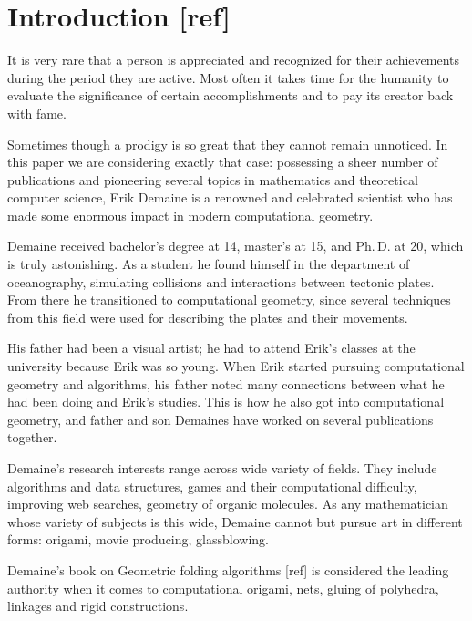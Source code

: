 \documentclass[a4paper,12pt]{article}
\begin{document}
\restoregeometry

\newpage \maketitle \vspace{1cm}

\tableofcontents \vfill \eject

\section{Introduction [ref]}

It is very rare that a person is appreciated and recognized for their achievements during the period they are active. Most often it takes time for the humanity to evaluate the significance of certain accomplishments and to pay its creator back with fame.

Sometimes though a prodigy is so great that they cannot remain unnoticed. In this paper we are considering exactly that case: possessing a sheer number of publications and pioneering several topics in mathematics and theoretical computer science, Erik Demaine is a renowned and celebrated scientist who has made some enormous impact in modern computational geometry.

Demaine received bachelor's degree at 14, master's at 15, and Ph.\,D. at 20, which is truly astonishing. As a student he found himself in the department of oceanography, simulating collisions and interactions between tectonic plates. From there he transitioned to computational geometry, since several techniques from this field were used for describing the plates and their movements.

His father had been a visual artist; he had to attend Erik's classes at the university because Erik was so young. When Erik started pursuing computational geometry and algorithms, his father noted many connections between what he had been doing and Erik's studies. This is how he also got into computational geometry, and father and son Demaines have worked on several publications together.

Demaine's research interests range across wide variety of fields. They include algorithms and data structures, games and their computational difficulty, improving web searches, geometry of organic molecules. As any mathematician whose variety of subjects is this wide, Demaine cannot but pursue art in different forms: origami, movie producing, glassblowing.

Demaine's book on Geometric folding algorithms [ref] is considered the leading authority when it comes to computational origami, nets, gluing of polyhedra, linkages and rigid constructions.
\end{document}
